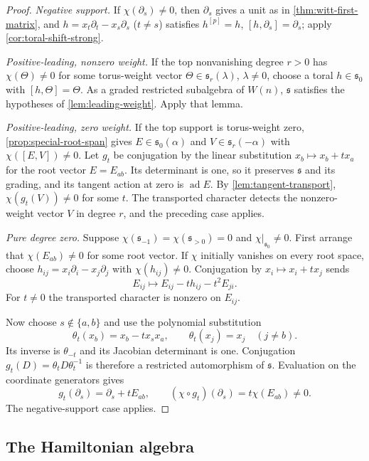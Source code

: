 \documentclass[11pt,reqno]{amsart}
\theoremstyle{definition}
\theoremstyle{remark}
\theoremstyle{definition}
\begin{document}
\begin{proof}
\emph{Negative support.} If $\chi(\partial_s)\ne0$, then $\partial_s$ gives
a unit as in \cref{thm:witt-first-matrix}, and $h=x_t\partial_t-x_s\partial_s$
($t\ne s$) satisfies $h^{[p]}=h$, $[h,\partial_s]=\partial_s$; apply
\cref{cor:toral-shift-strong}.

\emph{Positive-leading, nonzero weight.} If the top nonvanishing degree
$r>0$ has $\chi(\Theta)\ne0$ for some torus-weight vector
$\Theta\in\mathfrak s_r(\lambda)$, $\lambda\ne0$, choose a toral
$h\in\mathfrak s_0$ with $[h,\Theta]=\Theta$.  As a graded restricted
subalgebra of $W(n)$, $\mathfrak s$ satisfies the hypotheses of
\cref{lem:leading-weight}.  Apply that lemma.

\emph{Positive-leading, zero weight.} If the top support is torus-weight
zero, \cref{prop:special-root-span} gives $E\in\mathfrak s_0(\alpha)$ and
$V\in\mathfrak s_r(-\alpha)$ with $\chi([E,V])\ne0$.  Let $g_t$ be
conjugation by the linear substitution $x_b\mapsto x_b+tx_a$ for the
root vector $E=E_{ab}$.  Its determinant is one, so it preserves
$\mathfrak s$ and its grading, and its tangent action at zero is
$\operatorname{ad}E$.  By \cref{lem:tangent-transport},
$\chi(g_t(V))\ne0$ for some $t$.  The transported character detects the
nonzero-weight vector $V$ in degree $r$, and the preceding case applies.

\emph{Pure degree zero.} Suppose $\chi(\mathfrak s_{-1})=
\chi(\mathfrak s_{>0})=0$ and $\chi|_{\mathfrak s_0}\ne0$.
First arrange that $\chi(E_{ab})\ne0$ for some root vector.
If $\chi$ initially vanishes on every root space, choose
$h_{ij}=x_i\partial_i-x_j\partial_j$ with $\chi(h_{ij})\ne0$.
Conjugation by $x_i\mapsto x_i+t x_j$ sends
\[
 E_{ij}\longmapsto E_{ij}-t h_{ij}-t^2E_{ji}.
\]
For $t\ne0$ the transported character is nonzero on $E_{ij}$.

Now choose $s\notin\{a,b\}$ and use the polynomial substitution
\[
 \theta_t(x_b)=x_b-tx_sx_a,\qquad
 \theta_t(x_j)=x_j\quad(j\ne b).
\]
Its inverse is $\theta_{-t}$ and its Jacobian determinant is one.
Conjugation $g_t(D)=\theta_tD\theta_t^{-1}$ is therefore a restricted
automorphism of $\mathfrak s$. Evaluation on the coordinate generators gives
\[
 g_t(\partial_s)=\partial_s+tE_{ab},\qquad
 (\chi\circ g_t)(\partial_s)=t\chi(E_{ab})\ne0.
\]
The negative-support case applies.
\end{proof}

\subsection{The Hamiltonian algebra}
\end{document}

